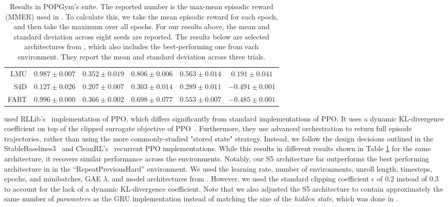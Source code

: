 \documentclass{article}
\begin{document}
\begin{table}[ht!]
\begin{tabular}{r|ccccc}
LMU        & $0.987 \pm 0.007$          & $0.352 \pm 0.019$          & $0.806 \pm 0.006$          & $0.563 \pm 0.014$          & $\mathbf{0.191 \pm 0.041}$ \\
S4D        & $0.127 \pm 0.026$          & $0.207 \pm 0.007$          & $0.303 \pm 0.014$          & $0.289 \pm 0.011$          & $-0.491 \pm 0.001$         \\
FART       & $\mathbf{0.996 \pm 0.000}$ & $0.366 \pm 0.002$          & $0.698 \pm 0.077$          & $0.553 \pm 0.007$          & $-0.485 \pm 0.001$
\end{tabular}
\vspace{1em}
\caption{Results in POPGym's suite. The reported number is the max-mean episodic reward (MMER) used in \citet{morad2023popgym}. To calculate this, we take the mean episodic reward for each epoch, and then take the maximum
over all epochs. For our results above, the mean and standard deviation across eight seeds are reported. The results below are selected architectures from \citet{morad2023popgym}, which also includes the best-performing one from each environment. They report the mean and standard deviation across three trials.}
\vspace{-1em}
\label{table:popgym-results-app}
\end{table}
\citet{morad2023popgym} used RLLib's~\citep{liang2018rllib} implementation of PPO, which differs significantly from standard implementations of PPO. It uses a dynamic KL-divergence coefficient on top of the clipped surrogate objective of PPO~\citep{ppo}. Furthermore, they use advanced orchestration to return full episode trajectories, rather than using the more commonly-studied "stored state" \cite{kapturowski2018recurrent} strategy.
Instead, we follow the design decisions outlined in the StableBaselines3~\citep{stable-baselines3} and CleanRL's~\citep{huang2022cleanrl} recurrent PPO implementations. While this results in different results shown in Table \ref{table:popgym-results-app} for the same architecture, it recovers similar performance across the environments. Notably, our S5 architecture far outperforms the best performing architecture in \citet{morad2023popgym} in the ``RepeatPreviousHard'' environment.
We used the learning rate, number of environments, unroll length, timesteps, epochs, and minibatches, GAE $\lambda$, and model architectures from \citet{morad2023popgym}. However, we used the standard clipping coefficient $\epsilon$ of $0.2$ instead of $0.3$ to account for the lack of a dynamic KL-divergence coefficient. Note that we also adjusted the S5 architecture to contain approximately the same number of \textit{parameters} as the GRU implementation instead of matching the size of the \textit{hidden state}, which was done in \citet{morad2023popgym}.
\end{document}
